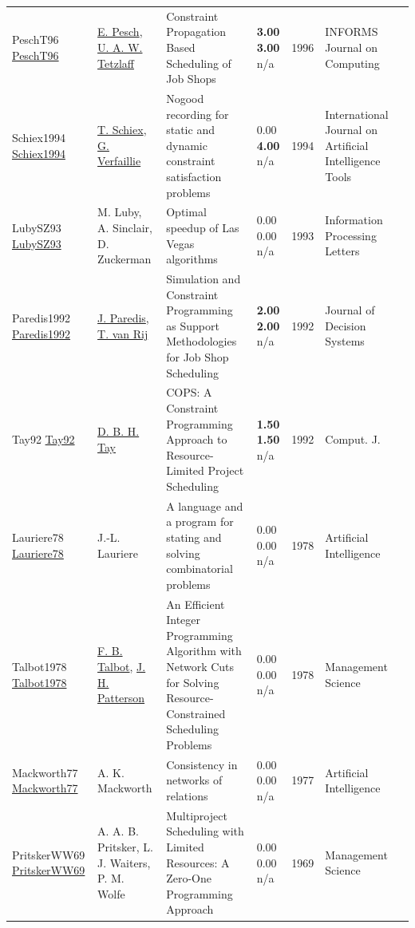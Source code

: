 {\begin{longtable}{p{3cm}p{5cm}p{10cm}p{1cm}rp{2.5cm}l}
PeschT96 \href{http://dx.doi.org/10.1287/ijoc.8.2.144}{PeschT96} & \hyperref[auth:a437]{E. Pesch}, \hyperref[auth:a1215]{U. A. W. Tetzlaff} & Constraint Propagation Based Scheduling of Job Shops & \noindent{}\textbf{3.00} \textbf{3.00} n/a & 1996 & \cellcolor{red!20}INFORMS Journal on Computing & \cite{PeschT96}\\
Schiex1994 \href{http://dx.doi.org/10.1142/s0218213094000108}{Schiex1994} & \hyperref[auth:a1718]{T. Schiex}, \hyperref[auth:a1719]{G. Verfaillie} & Nogood recording for static and dynamic constraint satisfaction problems & \noindent{}\textcolor{black!50}{0.00} \textbf{4.00} n/a & 1994 & International Journal on Artificial Intelligence Tools & \cite{Schiex1994}\\
LubySZ93 \href{http://dx.doi.org/10.1016/0020-0190(93)90029-9}{LubySZ93} & M. Luby, A. Sinclair, D. Zuckerman & Optimal speedup of Las Vegas algorithms & \noindent{}\textcolor{black!50}{0.00} \textcolor{black!50}{0.00} n/a & 1993 & Information Processing Letters & \cite{LubySZ93}\\
Paredis1992 \href{http://dx.doi.org/10.1080/12460125.1992.10511509}{Paredis1992} & \hyperref[auth:a1995]{J. Paredis}, \hyperref[auth:a1996]{T. van Rij} & Simulation and Constraint Programming as Support Methodologies for Job Shop Scheduling & \noindent{}\textbf{2.00} \textbf{2.00} n/a & 1992 & Journal of Decision Systems & \cite{Paredis1992}\\
Tay92 \href{}{Tay92} & \hyperref[auth:a700]{D. B. H. Tay} & {COPS:} {A} Constraint Programming Approach to Resource-Limited Project Scheduling & \noindent{}\textbf{1.50} \textbf{1.50} n/a & 1992 & Comput. J. & \cite{Tay92}\\
Lauriere78 \href{http://dx.doi.org/10.1016/0004-3702(78)90029-2}{Lauriere78} & J.-L. Lauriere & A language and a program for stating and solving combinatorial problems & \noindent{}\textcolor{black!50}{0.00} \textcolor{black!50}{0.00} n/a & 1978 & Artificial Intelligence & \cite{Lauriere78}\\
Talbot1978 \href{http://dx.doi.org/10.1287/mnsc.24.11.1163}{Talbot1978} & \hyperref[auth:a1495]{F. B. Talbot}, \hyperref[auth:a1496]{J. H. Patterson} & An Efficient Integer Programming Algorithm with Network Cuts for Solving Resource-Constrained Scheduling Problems & \noindent{}\textcolor{black!50}{0.00} \textcolor{black!50}{0.00} n/a & 1978 & Management Science & \cite{Talbot1978}\\
Mackworth77 \href{http://dx.doi.org/10.1016/0004-3702(77)90007-8}{Mackworth77} & A. K. Mackworth & Consistency in networks of relations & \noindent{}\textcolor{black!50}{0.00} \textcolor{black!50}{0.00} n/a & 1977 & Artificial Intelligence & \cite{Mackworth77}\\
PritskerWW69 \href{http://dx.doi.org/10.1287/mnsc.16.1.93}{PritskerWW69} & A. A. B. Pritsker, L. J. Waiters, P. M. Wolfe & Multiproject Scheduling with Limited Resources: A Zero-One Programming Approach & \noindent{}\textcolor{black!50}{0.00} \textcolor{black!50}{0.00} n/a & 1969 & Management Science & \cite{PritskerWW69}\\
\end{longtable}
}

